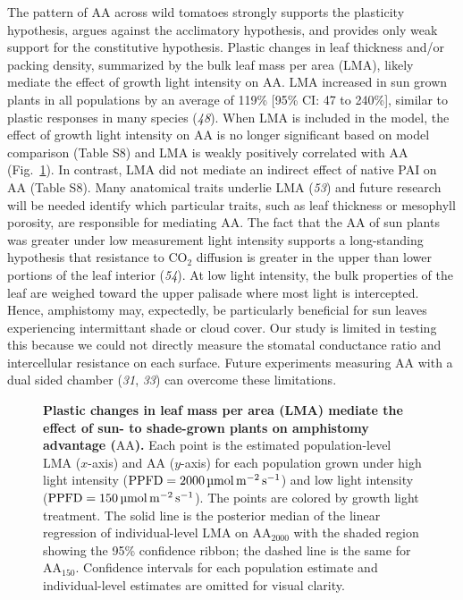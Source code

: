 \documentclass[
  letterpaper,
  DIV=11,
  numbers=noendperiod]{scrartcl}
\newcommand{\aahigh}{\mathrm{AA}_{2000}}
\newcommand{\aalow}{\mathrm{AA}_{150}}
\newcommand{\aax}{$\mathrm{AA}$}
\newcommand{\ppfdequals}[1]{$\mathrm{PPFD} = \qty{#1}{\micro\mol\raiseto{-2}\meter\raiseto{-1}\second}$}
\begin{document}
The pattern of \aax{} across wild tomatoes strongly supports the
plasticity hypothesis, argues against the acclimatory hypothesis, and
provides only weak support for the constitutive hypothesis. Plastic
changes in leaf thickness and/or packing density, summarized by the bulk
leaf mass per area (LMA), likely mediate the effect of growth light
intensity on \aax{}. LMA increased in sun grown plants in all
populations by an average of 119\% {[}95\% CI: 47 to 240\%{]}, similar
to plastic responses in many species (\emph{48}). When LMA is included
in the model, the effect of growth light intensity on \aax{} is no
longer significant based on model comparison (Table S8) and LMA is
weakly positively correlated with \aax{} (Fig.~\ref{fig-lma_aa}). In
contrast, LMA did not mediate an indirect effect of native PAI on \aax{}
(Table S8). Many anatomical traits underlie LMA (\emph{53}) and future
research will be needed identify which particular traits, such as leaf
thickness or mesophyll porosity, are responsible for mediating \aax{}.
The fact that the \aax{} of sun plants was greater under low measurement
light intensity supports a long-standing hypothesis that resistance to
CO\(_2\) diffusion is greater in the upper than lower portions of the
leaf interior (\emph{54}). At low light intensity, the bulk properties
of the leaf are weighed toward the upper palisade where most light is
intercepted. Hence, amphistomy may, expectedly, be particularly
beneficial for sun leaves experiencing intermittant shade or cloud
cover. Our study is limited in testing this because we could not
directly measure the stomatal conductance ratio and intercellular
resistance on each surface. Future experiments measuring \aax{} with a
dual sided chamber (\emph{31}, \emph{33}) can overcome these
limitations.

\begin{figure}


\caption{\label{fig-lma_aa}\textbf{Plastic changes in leaf mass per area (LMA) mediate the effect of sun- to shade-grown plants on amphistomy advantage (\aax{}).}
Each point is the estimated population-level LMA (\(x\)-axis) and \aax{}
(\(y\)-axis) for each population grown under high light intensity
(\ppfdequals{2000}) and low light intensity (\ppfdequals{150}). The
points are colored by growth light treatment. The solid line is the
posterior median of the linear regression of individual-level LMA on
\(\aahigh\) with the shaded region showing the 95\% confidence ribbon;
the dashed line is the same for \(\aalow\). Confidence intervals for
each population estimate and individual-level estimates are omitted for
visual clarity.}

\end{figure}%
\end{document}
